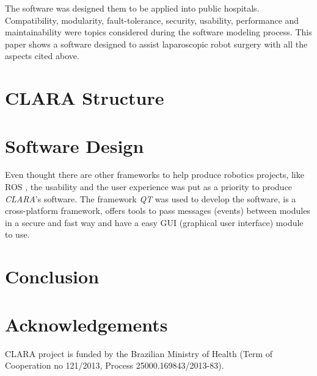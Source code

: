 \documentclass{svproc}
\begin{document}
\begin{multicols}{2}
 	
 	The software was designed them to be applied into public hospitals. Compatibility, modularity, fault-tolerance, security, usability, performance and maintainability were topics considered during the software modeling process. This paper shows a software designed to assist laparoscopic robot surgery with all the aspects cited above.
 	
	\section{CLARA Structure}
	
	
	
	
	\section{Software Design}
	
	
	Even thought there are other frameworks to help produce robotics projects, like ROS \cite{288}, the usability and the user experience was put as a priority to produce \textit{CLARA}'s software. The framework \textit{QT}\cite{qt} was used to develop the software, is a cross-platform framework, offers tools to pass messages (events) between modules in a secure and fast way and have a easy GUI (graphical user interface) module to use.

	
	\section{Conclusion}

	
	\section{Acknowledgements}
	
	CLARA project is funded by the Brazilian Ministry of Health (Term of Cooperation no 121/2013, Process 25000.169843/2013-83). 
		
	
	 
	
	\end{multicols}
	
\end{document}
